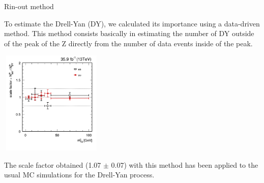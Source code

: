 \documentclass[handout,8 pt]{beamer}
\begin{document}
\begin{frame}{Rin-out method}

	\justifying
	To estimate the Drell-Yan (DY), we calculated its importance using a data-driven method. This method consists basically in estimating the number of DY outside of the peak of the Z directly from the number of data events inside of the peak. \vfill

	\begin{center}
		\includegraphics[width= 140pt, height= 140pt]{figs/dy_scale-4.png} \\
	\end{center}
	
	The scale factor obtained (1.07 $\pm$ 0.07) with this method has been applied to the usual MC simulations for the Drell-Yan process. \vfill

\end{frame}
\end{document}
